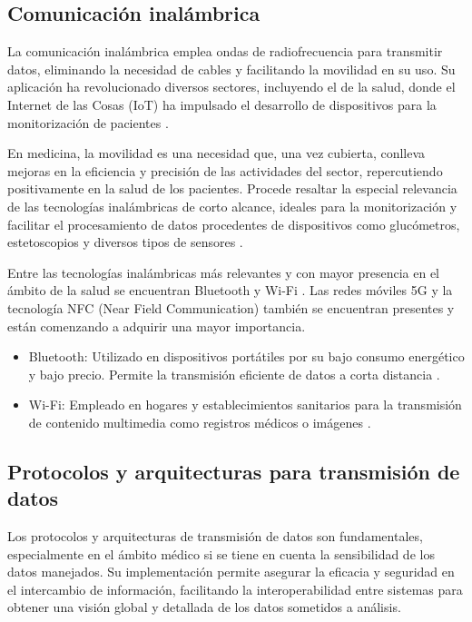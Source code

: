 \subsection{Comunicación inalámbrica}

La comunicación inalámbrica emplea ondas de radiofrecuencia para transmitir datos, eliminando la necesidad de cables y facilitando la movilidad en su uso. Su aplicación ha revolucionado diversos sectores, incluyendo el de la salud, donde el Internet de las Cosas (IoT) ha impulsado el desarrollo de dispositivos para la monitorización de pacientes \cite{Creation:online} \cite{gardasevic2020emerging}.

En medicina, la movilidad es una necesidad que, una vez cubierta, conlleva mejoras en la eficiencia y precisión de las actividades del sector, repercutiendo positivamente en la salud de los pacientes. Procede resaltar la especial relevancia de las tecnologías inalámbricas de corto alcance, ideales para la monitorización y facilitar el procesamiento de datos procedentes de dispositivos como glucómetros, estetoscopios y diversos tipos de sensores \cite{gutierrez2013diseno}.

Entre las tecnologías inalámbricas más relevantes y con mayor presencia en el ámbito de la salud se encuentran Bluetooth y Wi-Fi \cite{tec}. Las redes móviles 5G y la tecnología NFC (Near Field Communication) también se encuentran presentes y están comenzando a adquirir una mayor importancia.
\begin{itemize}
    \item Bluetooth: Utilizado en dispositivos portátiles por su bajo consumo energético y bajo precio. Permite la transmisión eficiente de datos a corta distancia \cite{wang2006bluetooth}.
    \item Wi-Fi: Empleado en hogares y establecimientos sanitarios para la transmisión de contenido multimedia como registros médicos o imágenes \cite{tec}.
\end{itemize}

\subsection{Protocolos y arquitecturas para transmisión de datos}

Los protocolos y arquitecturas de transmisión de datos son fundamentales, especialmente en el ámbito médico si se tiene en cuenta la sensibilidad de los datos manejados. Su implementación permite asegurar la eficacia y seguridad en el intercambio de información, facilitando la interoperabilidad entre sistemas para obtener una visión global y detallada de los datos sometidos a análisis.

